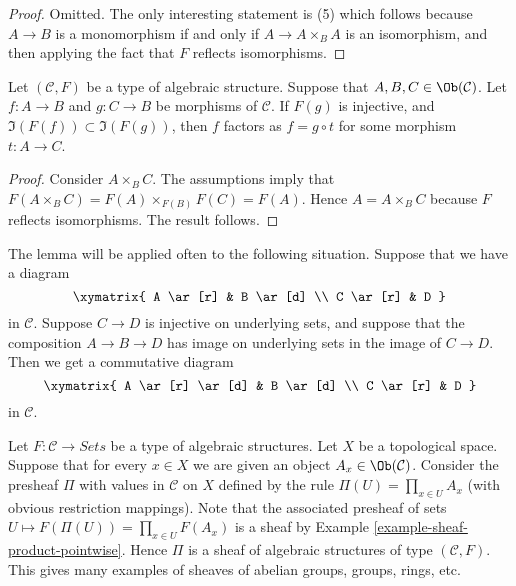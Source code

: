 \begin{proof}
Omitted. The only interesting statement is (5) which
follows because $A \to B$ is a monomorphism if and only if
$A \to A \times_B A$ is an isomorphism, and then applying
the fact that $F$ reflects isomorphisms.
\end{proof}

\begin{lemma}
\label{lemma-image-contained-in}
Let $(\mathcal{C}, F)$ be a type of algebraic structure.
Suppose that $A, B, C \in \Ob(\mathcal{C})$.
Let $f : A \to B$ and $g : C \to B$ be morphisms of
$\mathcal{C}$. If $F(g)$ is injective, and
$\Im(F(f)) \subset \Im(F(g))$, then
$f$ factors as $f = g \circ t$ for some morphism
$t : A \to C$.
\end{lemma}

\begin{proof}
Consider $A \times_B C$. The assumptions imply that
$F(A \times_B C) = F(A) \times_{F(B)} F(C) = F(A)$.
Hence $A = A \times_B C$ because $F$ reflects isomorphisms.
The result follows.
\end{proof}

\begin{example}
\label{example-application-lemma-image-contained-in}
The lemma will be applied often to the following situation.
Suppose that we have a diagram
$$
\xymatrix{
A \ar[r] & B \ar[d] \\
C \ar[r] & D
}
$$
in $\mathcal{C}$. Suppose $C \to D$ is injective on underlying
sets, and suppose that the composition $A \to B \to D$ has
image on underlying sets in the image of $C \to D$.
Then we get a commutative diagram
$$
\xymatrix{
A \ar[r] \ar[d] & B \ar[d] \\
C \ar[r] & D
}
$$
in $\mathcal{C}$.
\end{example}

\begin{example}
\label{example-sheaf-product-pointwise-algebraic-structure}
Let $F : \mathcal{C} \to \textit{Sets}$ be a
type of algebraic structures.
Let $X$ be a topological space. Suppose that
for every $x \in X$ we are given an object
$A_x \in \Ob(\mathcal{C})$. Consider the presheaf
$\Pi$ with values in $\mathcal{C}$ on $X$ defined by the rule
$\Pi(U) = \prod_{x \in U} A_x$ (with obvious restriction
mappings). Note that the associated presheaf of sets
$U \mapsto F(\Pi(U)) = \prod_{x \in U} F(A_x)$ is a sheaf
by Example \ref{example-sheaf-product-pointwise}.
Hence $\Pi$ is a sheaf of algebraic structures
of type $(\mathcal{C} , F)$. This gives many examples
of sheaves of abelian groups, groups, rings, etc.
\end{example}














